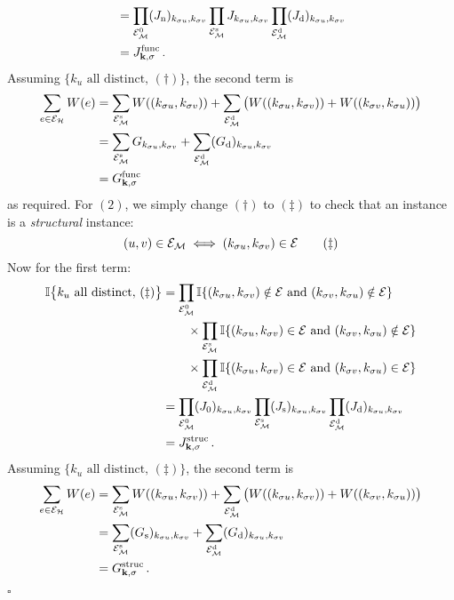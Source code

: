 \begin{prf}
\begin{align*}
%
	&= \prod_{\ca{E}_\ca{M}^0} (J_\mathrm{n})_{k_{\sigma u},k_{\sigma v}}
	\prod_{\ca{E}_\ca{M}^\mathrm{s}} J_{k_{\sigma u},k_{\sigma v}}
	\prod_{\ca{E}_\ca{M}^\mathrm{d}} (J_\mathrm{d})_{k_{\sigma u},k_{\sigma v}} \\
%
	&= J^\mathrm{func}_{\mathbf{k},\sigma}\,.
%
\end{align*}
%
Assuming $\big\{ k_u \textrm{ all distinct}, \, (\dagger) \big\}$, the second term is
%
\begin{align*}
%
	\sum_{e \in \ca{E_H}} W(e)
	&= \sum_{\ca{E}_\ca{M}^\mathrm{s}} W((k_{\sigma u},k_{\sigma v}))
	+ \sum_{\ca{E}_\ca{M}^\mathrm{d}} \big( W((k_{\sigma u},k_{\sigma v})) + W((k_{\sigma v},k_{\sigma u})) \big) \\
%
	&= \sum_{\ca{E}_\ca{M}^\mathrm{s}} G_{k_{\sigma u},k_{\sigma v}}
	+ \sum_{\ca{E}_\ca{M}^\mathrm{d}} (G_\mathrm{d})_{k_{\sigma u},k_{\sigma v}} \\
%
	&= G^\mathrm{func}_{\mathbf{k},\sigma}
\end{align*}
%
as required. For $(2)$, we simply change $(\dagger)$ to $(\ddagger)$ to check that an instance is a \emph{structural} instance:
%
$$ (u,v) \in \mathcal{E_M} \iff (k_{\sigma u}, k_{\sigma v}) \in \mathcal{E} \qquad (\ddagger) $$
%
Now for the first term:
%
\begin{align*}
%
	\bb{I} \big\{ k_u \textrm{ all distinct}, \, (\ddagger) \big\}
	&= \prod_{\ca{E}_\ca{M}^0} \bb{I} \{(k_{\sigma u}, k_{\sigma v}) \notin \ca{E} \textrm{ and } (k_{\sigma v}, k_{\sigma u}) \notin \ca{E}\} \\
	& \qquad \times \prod_{\ca{E}_\ca{M}^\mathrm{s}} \bb{I} \{(k_{\sigma u}, k_{\sigma v}) \in \ca{E} \textrm{ and } (k_{\sigma v}, k_{\sigma u}) \notin \ca{E}\} \\
	& \qquad \times \prod_{\ca{E}_\ca{M}^\mathrm{d}} \bb{I} \{(k_{\sigma u}, k_{\sigma v}) \in \ca{E} \textrm{ and } (k_{\sigma v}, k_{\sigma u}) \in \ca{E}\} \\
%
	&= \prod_{\ca{E}_\ca{M}^0} (J_\mathrm{0})_{k_{\sigma u},k_{\sigma v}}
	\prod_{\ca{E}_\ca{M}^\mathrm{s}} (J_\mathrm{s})_{k_{\sigma u},k_{\sigma v}}
	\prod_{\ca{E}_\ca{M}^\mathrm{d}} (J_\mathrm{d})_{k_{\sigma u},k_{\sigma v}} \\
%
	&= J^\mathrm{struc}_{\mathbf{k},\sigma}\,.
%
\end{align*}
%
Assuming $\big\{ k_u \textrm{ all distinct}, \, (\ddagger) \big\}$, the second term is
%
\begin{align*}
%
	\sum_{e \in \ca{E_H}} W(e)
	&= \sum_{\ca{E}_\ca{M}^\mathrm{s}} W((k_{\sigma u},k_{\sigma v}))
	+ \sum_{\ca{E}_\ca{M}^\mathrm{d}} \big( W((k_{\sigma u},k_{\sigma v})) + W((k_{\sigma v},k_{\sigma u})) \big) \\
%
	&= \sum_{\ca{E}_\ca{M}^\mathrm{s}} (G_\mathrm{s})_{k_{\sigma u},k_{\sigma v}}
	+ \sum_{\ca{E}_\ca{M}^\mathrm{d}} (G_\mathrm{d})_{k_{\sigma u},k_{\sigma v}} \\
%
	&= G^\mathrm{struc}_{\mathbf{k},\sigma}\,.
\end{align*}

\hfill $\square$
\end{prf}
